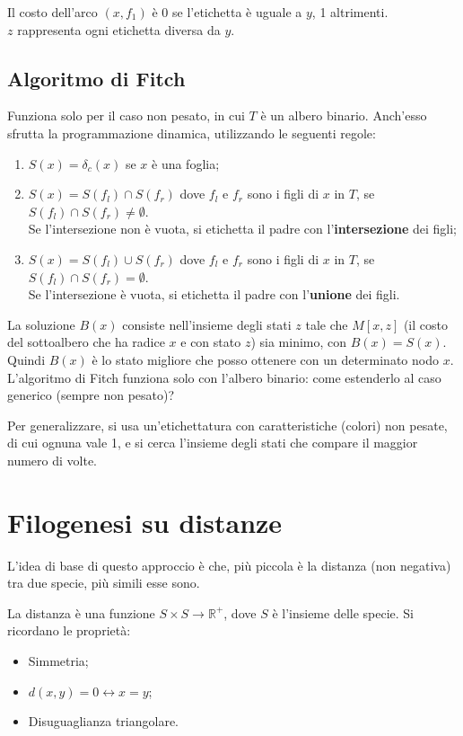 Il costo dell'arco $(x, f_1)$ è 0 se l'etichetta è uguale a $y$, 1 altrimenti. \\
$z$ rappresenta ogni etichetta diversa da $y$. 

\subsection{Algoritmo di Fitch}
Funziona solo per il caso non pesato, in cui $T$ è un albero binario. Anch'esso sfrutta la programmazione dinamica, utilizzando le seguenti regole:
\begin{enumerate}
	\item $S(x) = \delta_c(x)$ se $x$ è una foglia;
	\item $S(x) = S(f_l) \cap S(f_r)$ dove $f_l$ e $f_r$ sono i figli di $x$ in $T$, se $S(f_l) \cap S(f_r) \neq \emptyset$. \\
	Se l'intersezione non è vuota, si etichetta il padre con l'\textbf{intersezione} dei figli;
	\item $S(x) = S(f_l) \cup S(f_r)$ dove $f_l$ e $f_r$ sono i figli di $x$ in $T$, se $S(f_l) \cap S(f_r) = \emptyset$. \\
	Se l'intersezione è vuota, si etichetta il padre con l'\textbf{unione} dei figli.
\end{enumerate}

La soluzione $B(x)$ consiste nell'insieme degli stati $z$ tale che $M[x, z]$ (il costo del sottoalbero che ha radice $x$ e con stato $z$) sia minimo, con $B(x) = S(x)$. Quindi $B(x)$ è lo stato migliore che posso ottenere con un determinato nodo $x$.
L'algoritmo di Fitch funziona solo con l'albero binario: come estenderlo al caso generico (sempre non pesato)?

Per generalizzare, si usa un'etichettatura con caratteristiche (colori) non pesate, di cui ognuna vale 1, e si cerca l'insieme degli stati che compare il maggior numero di volte.

\section{Filogenesi su distanze}
L'idea di base di questo approccio è che, più piccola è la distanza (non negativa) tra due specie, più simili esse sono.

La distanza è una funzione $S \times S \rightarrow \mathbb{R}^+$, dove $S$ è l'insieme delle specie. Si ricordano le proprietà:
\begin{itemize}
	\item Simmetria;
	\item $d(x, y) = 0 \leftrightarrow x = y$;
	\item Disuguaglianza triangolare.
\end{itemize}

